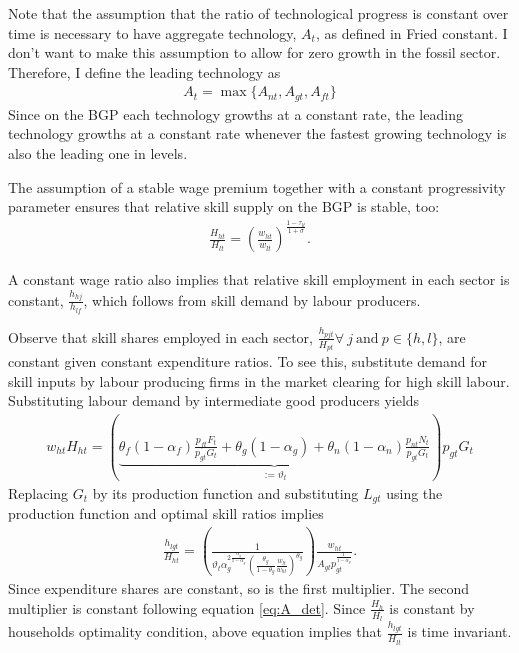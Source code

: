 Note that the assumption that the ratio of technological progress is constant over time is necessary to have aggregate technology, $A_t$, as defined in Fried constant. I don't want to make this assumption to allow for zero growth in the fossil sector. Therefore, I define the leading technology as 
\begin{align}
A_t= \max\{A_{nt}, A_{gt}, A_{ft}\}
\end{align}
Since on the BGP each technology growths at a constant rate, the leading technology growths at a constant rate  whenever the fastest growing technology is also the leading one in levels.

The assumption of a stable wage premium together with a constant progressivity parameter ensures that relative skill supply on the BGP is stable, too: 
\begin{align}
\frac{H_{ht}}{H_{lt}}=\left(\frac{w_{ht}}{w_{lt}}\right)^\frac{1-\tau_{lt}}{1+\sigma}.
\end{align}

A constant wage ratio also implies that relative skill employment in each sector is constant, $\frac{h_{hj}}{h_{lf}}$, which follows from skill demand by labour producers. 


Observe that skill shares employed in each sector, $\frac{h_{pjt}}{H_{pt}} \forall \ j\ \text{and} \ p\in\{h,l\}$, are constant given constant expenditure ratios. 
To see this, substitute demand for skill inputs by labour producing firms in the market clearing for high skill labour. Substituting labour demand by intermediate good producers yields
\begin{align}
w_{ht}H_{ht}= \left(\underbrace{\theta_f (1-\alpha_f)\frac{p_{ft}F_t}{p_{gt}G_t}+\theta_{g}(1-\alpha_g)+\theta_n(1-\alpha_n)\frac{p_{nt}N_t}{p_{gt}G_t}}_{:=\vartheta_t}\right)p_{gt}G_t
\end{align}
Replacing $G_t$ by its production function and substituting $L_{gt}$ using the production function and optimal skill ratios implies
\begin{align}
\frac{h_{lgt}}{H_{ht}}=\left(\frac{1}{\vartheta_t\alpha_g^{2\frac{\alpha_g}{1-\alpha_g}}\left(\frac{\theta_g}{1-\theta_g}\frac{w_{lt}}{w_{ht}}\right)^{\theta_{g}}}\right)\frac{w_{ht}}{A_{gt}p_{gt}^\frac{1}{1-\alpha_g}}.
\end{align}
Since expenditure shares are constant, so is the first multiplier. The second multiplier is constant following equation \ref{eq:A_det}. Since $\frac{H_h}{H_l}$ is constant by households optimality condition, above equation implies that $\frac{h_{lgt}}{H_{lt}}$ is time invariant. 
